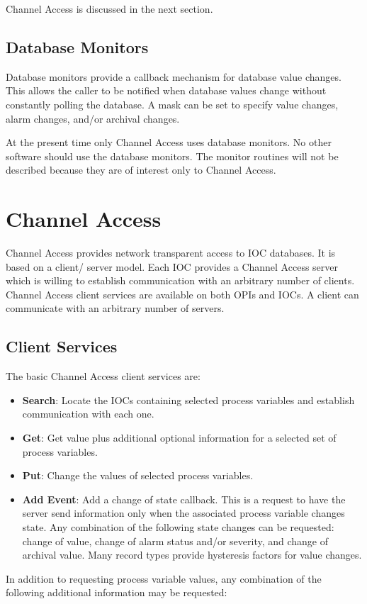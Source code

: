 Channel Access is discussed in the next section.

\subsection{Database Monitors}

Database monitors  provide a callback mechanism for database value changes. This allows the caller to be notified when 
database values change without constantly polling the database. A mask can be set to specify value changes, alarm  
changes, and/or archival changes. 

At the present time only Channel Access uses database monitors. No other software should use the database monitors.  
The monitor routines will not be described because they are of interest only to Channel Access.

\section{Channel Access}

Channel Access provides network transparent access to IOC databases. It is based on a client/ server model. Each IOC 
provides a Channel Access server which is willing to establish communication with an arbitrary number of clients. 
Channel Access client services are available on both OPIs and IOCs. A client can communicate with an arbitrary number 
of servers.

\subsection{Client Services}

The basic Channel Access client services are:

\begin{itemize}

\item \textbf{Search}:  Locate the IOCs containing selected process variables and establish communication with each one.

\item \textbf{Get}:  Get value plus additional optional information for a selected set of process variables.

\item \textbf{Put}:  Change the values of selected process variables.

\item \textbf{Add Event}: Add a change of state callback. This is a request to have the server send information only when the 
associated process variable changes state. Any combination of the following state changes can be requested: 
change of value, change of alarm status and/or severity, and change of archival value. Many record types provide 
hysteresis factors for value changes.

\end{itemize}In addition to requesting process variable values, any combination of the following additional information may be 
requested:

